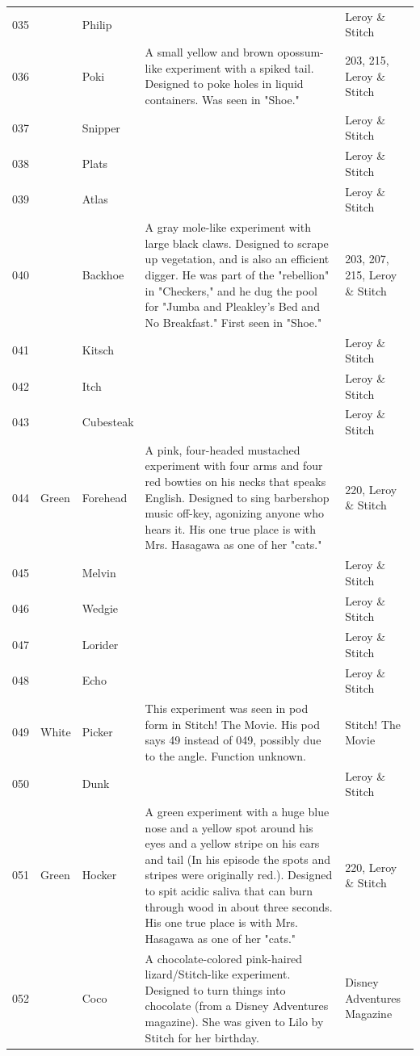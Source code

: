 \documentclass{article}
\begin{document}
\begin{tabular}{lllll}
035 &  & Philip &  & Leroy \& Stitch \\
036 &  & Poki & A small yellow and brown opossum-like experiment with a spiked tail. Designed to poke holes in liquid containers. Was seen in "Shoe." & 203, 215, Leroy \& Stitch \\
037 &  & Snipper &  & Leroy \& Stitch \\
038 &  & Plats &  & Leroy \& Stitch \\
039 &  & Atlas &  & Leroy \& Stitch \\
040 &  & Backhoe & A gray mole-like experiment with large black claws. Designed to scrape up vegetation, and is also an efficient digger. He was part of the "rebellion" in "Checkers," and he dug the pool for "Jumba and Pleakley's Bed and No Breakfast." First seen in "Shoe." & 203, 207, 215, Leroy \& Stitch \\
041 &  & Kitsch &  & Leroy \& Stitch \\
042 &  & Itch &  & Leroy \& Stitch \\
043 &  & Cubesteak &  & Leroy \& Stitch \\
044 & Green & Forehead & A pink, four-headed mustached experiment with four arms and four red bowties on his necks that speaks English. Designed to sing barbershop music off-key, agonizing anyone who hears it. His one true place is with Mrs. Hasagawa as one of her "cats." & 220, Leroy \& Stitch \\
045 &  & Melvin &  & Leroy \& Stitch \\
046 &  & Wedgie &  & Leroy \& Stitch \\
047 &  & Lorider &  & Leroy \& Stitch \\
048 &  & Echo &  & Leroy \& Stitch \\
049 & White & Picker & This experiment was seen in pod form in Stitch! The Movie. His pod says 49 instead of 049, possibly due to the angle. Function unknown. & Stitch! The Movie \\
050 &  & Dunk &  & Leroy \& Stitch \\
051 & Green & Hocker & A green experiment with a huge blue nose and a yellow spot around his eyes and a yellow stripe on his ears and tail (In his episode the spots and stripes were originally red.). Designed to spit acidic saliva that can burn through wood in about three seconds. His one true place is with Mrs. Hasagawa as one of her "cats." & 220, Leroy \& Stitch \\
052 &  & Coco & A chocolate-colored pink-haired lizard/Stitch-like experiment. Designed to turn things into chocolate (from a Disney Adventures magazine). She was given to Lilo by Stitch for her birthday. & Disney Adventures Magazine \\

\end{tabular}
\end{document}
